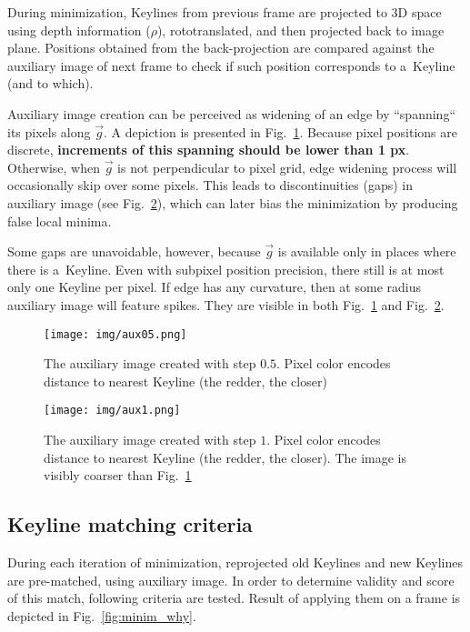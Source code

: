 During minimization, Keylines from previous frame are projected to 3D space using depth information ($\rho$), rototranslated, and then projected back to image plane. Positions obtained from the back-projection are compared against the auxiliary image of next frame to check if such position corresponds to a~Keyline (and to which).

Auxiliary image creation can be perceived as widening of an edge by ``spanning`` its pixels along $\vec{g}$. A depiction is presented in Fig.~\ref{fig:aux1}. Because pixel positions are discrete, \textbf{increments of this spanning should be lower than 1 px}. Otherwise, when $\vec{g}$ is not perpendicular to pixel grid, edge widening process will occasionally skip over some pixels. This leads to discontinuities (gaps) in auxiliary image (see Fig.~\ref{fig:aux2}), which can later bias the minimization by producing false local minima.

Some gaps are unavoidable, however, because $\vec{g}$ is available only in places where there is a~Keyline. Even with subpixel position precision, there still is at most only one Keyline per pixel. If edge has any curvature, then at some radius auxiliary image will feature spikes. They are visible in both Fig.~\ref{fig:aux1} and Fig.~\ref{fig:aux2}.

\begin{figure}[hp]
	\centering\texttt{[image: img/aux05.png]}
	\caption{ The auxiliary image created with step $0.5$. Pixel color encodes distance to nearest Keyline (the redder, the closer) }
	\label{fig:aux1}
\end{figure}

\begin{figure}[ht]
	\centering\texttt{[image: img/aux1.png]}
	\caption{ The auxiliary image created with step $1$. Pixel color encodes distance to nearest Keyline (the redder, the closer). The image is visibly coarser than Fig.~\ref{fig:aux1} }
	\label{fig:aux2}
\end{figure}



\subsection{Keyline matching criteria}
\label{sec:minim_match}

During each iteration of minimization, reprojected old Keylines and new Keylines are pre-matched, using auxiliary image. In order to determine validity and score of this match, following criteria are tested. Result of applying them on a frame is depicted in Fig.~\ref{fig:minim_why}.

